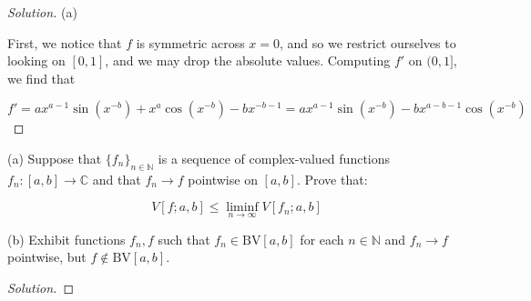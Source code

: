 \documentclass[10pt]{article}
\newcommand{\bv}{{\text{BV}}}
\newenvironment{problem}[2][Problem]{\begin{trivlist}
\item[\hskip \labelsep {\bfseries #1}\hskip \labelsep {\bfseries #2.}]}{\end{trivlist}}
\begin{document}
\begin{proof}[Solution]

(a)

First, we notice that $f$ is symmetric across $x = 0$, and so we restrict ourselves to looking on $[0,1]$, and we may drop the absolute values. Computing $f'$ on $(0,1]$, we find that 

$$f' = ax^{a-1} \sin(x^{-b}) + x^{a} \cos(x^{-b}) -b x^{-b -1} =  a x^{a-1}\sin(x^{-b}) - b  x^{a- b-1}\cos(x^{-b}) $$

\end{proof}

\begin{problem}{5.2.23}

(a) Suppose that $\{ f_n \}_{n \in \mathbb{N}}$ is a sequence of complex-valued functions $f_n: [a,b] \to \mathbb{C}$ and that $f_n \to f$ pointwise on $[a,b]$. Prove that:

$$ V[f;a,b] \leq \liminf_{n \to \infty} V[f_n; a,b]$$

(b) Exhibit functions $f_n, f$ such that $f_n \in \bv[a,b]$ for each $n \in \mathbb{N}$ and $f_n \to f$ pointwise, but $f \not \in \bv[a,b]$.
\end{problem}

\begin{proof}[Solution]


\end{proof}
\end{document}
